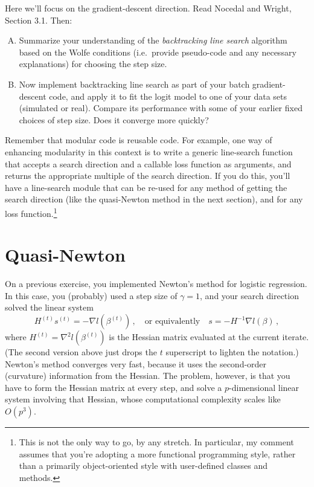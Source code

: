 \documentclass{mynotes}
\begin{document}
Here we'll focus on the gradient-descent direction.  Read Nocedal and Wright, Section 3.1.  Then:

\begin{enumerate}[(A)]
\item Summarize your understanding of the \textit{backtracking line search} algorithm based on the Wolfe conditions (i.e.~provide pseudo-code and any necessary explanations) for choosing the step size.
\item Now implement backtracking line search as part of your batch gradient-descent code, and apply it to fit the logit model to one of your data sets (simulated or real).  Compare its performance with some of your earlier fixed choices of step size.  Does it converge more quickly?
\end{enumerate}

Remember that modular code is reusable code.  For example, one way of enhancing modularity in this context is to write a generic line-search function that accepts a search direction and a callable loss function as arguments, and returns the appropriate multiple of the search direction.  If you do this, you'll have a line-search module that can be re-used for any method of getting the search direction (like the quasi-Newton method in the next section), and for any loss function.\footnote{This is not the only way to go, by any stretch.  In particular, my comment assumes that you're adopting a more functional programming style, rather than a primarily object-oriented style with user-defined classes and methods.}


\section{Quasi-Newton}

On a previous exercise, you implemented Newton's method for logistic regression.  In this case, you (probably) used a step size of $\gamma = 1$, and your search direction solved the linear system
$$
H^{(t)} s^{(t)} = - \nabla l(\beta^{(t)}) \, , \quad \mbox{or equivalently} \quad  s = -H^{-1} \nabla l(\beta) \, ,
$$
where $H^{(t)} = \nabla^2 l(\beta^{(t)})$ is the Hessian matrix evaluated at the current iterate.  (The second version above just drops the $t$ superscript to lighten the notation.)    Newton's method converges very fast, because it uses the second-order (curvature) information from the Hessian.  The problem, however, is that you have to form the Hessian matrix at every step, and solve a $p$-dimensional linear system involving that Hessian, whose computational complexity scales like $O(p^3)$.
\end{document}
